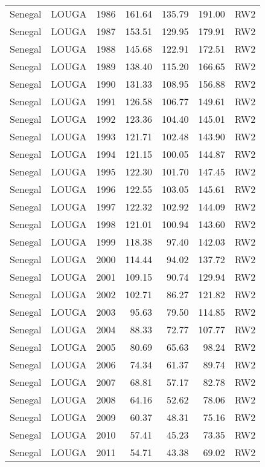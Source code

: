 \begin{longtable}{lllrrrl}
  Senegal & LOUGA & 1986 & 161.64 & 135.79 & 191.00 & RW2 \\ 
  Senegal & LOUGA & 1987 & 153.51 & 129.95 & 179.91 & RW2 \\ 
  Senegal & LOUGA & 1988 & 145.68 & 122.91 & 172.51 & RW2 \\ 
  Senegal & LOUGA & 1989 & 138.40 & 115.20 & 166.65 & RW2 \\ 
  Senegal & LOUGA & 1990 & 131.33 & 108.95 & 156.88 & RW2 \\ 
  Senegal & LOUGA & 1991 & 126.58 & 106.77 & 149.61 & RW2 \\ 
  Senegal & LOUGA & 1992 & 123.36 & 104.40 & 145.01 & RW2 \\ 
  Senegal & LOUGA & 1993 & 121.71 & 102.48 & 143.90 & RW2 \\ 
  Senegal & LOUGA & 1994 & 121.15 & 100.05 & 144.87 & RW2 \\ 
  Senegal & LOUGA & 1995 & 122.30 & 101.70 & 147.45 & RW2 \\ 
  Senegal & LOUGA & 1996 & 122.55 & 103.05 & 145.61 & RW2 \\ 
  Senegal & LOUGA & 1997 & 122.32 & 102.92 & 144.09 & RW2 \\ 
  Senegal & LOUGA & 1998 & 121.01 & 100.94 & 143.60 & RW2 \\ 
  Senegal & LOUGA & 1999 & 118.38 & 97.40 & 142.03 & RW2 \\ 
  Senegal & LOUGA & 2000 & 114.44 & 94.02 & 137.72 & RW2 \\ 
  Senegal & LOUGA & 2001 & 109.15 & 90.74 & 129.94 & RW2 \\ 
  Senegal & LOUGA & 2002 & 102.71 & 86.27 & 121.82 & RW2 \\ 
  Senegal & LOUGA & 2003 & 95.63 & 79.50 & 114.85 & RW2 \\ 
  Senegal & LOUGA & 2004 & 88.33 & 72.77 & 107.77 & RW2 \\ 
  Senegal & LOUGA & 2005 & 80.69 & 65.63 & 98.24 & RW2 \\ 
  Senegal & LOUGA & 2006 & 74.34 & 61.37 & 89.74 & RW2 \\ 
  Senegal & LOUGA & 2007 & 68.81 & 57.17 & 82.78 & RW2 \\ 
  Senegal & LOUGA & 2008 & 64.16 & 52.62 & 78.06 & RW2 \\ 
  Senegal & LOUGA & 2009 & 60.37 & 48.31 & 75.16 & RW2 \\ 
  Senegal & LOUGA & 2010 & 57.41 & 45.23 & 73.35 & RW2 \\ 
  Senegal & LOUGA & 2011 & 54.71 & 43.38 & 69.02 & RW2 \\ 

\end{longtable}
